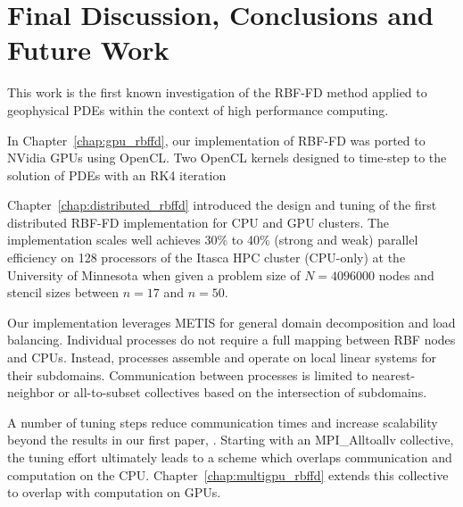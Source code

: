 \chapter{Final Discussion, Conclusions and Future Work}
\label{chap:conclusions}

This work is the first known investigation of the RBF-FD method applied to geophysical PDEs within the context of high performance computing. 

In Chapter~\ref{chap:gpu_rbffd}, our implementation of RBF-FD was ported to NVidia GPUs using OpenCL. Two OpenCL kernels designed to time-step to the solution of PDEs with an RK4 iteration 


Chapter~\ref{chap:distributed_rbffd} introduced the design and tuning of the first distributed RBF-FD implementation for CPU and GPU clusters. The implementation scales well achieves 30\% to 40\% (strong and weak) parallel efficiency on 128 processors of the Itasca HPC cluster (CPU-only) at the University of Minnesota when given a problem size of $N=4096000$ nodes and stencil sizes between $n=17$ and $n=50$. 

Our implementation leverages METIS for general domain decomposition and load balancing. Individual processes do not require a full mapping between RBF nodes and CPUs. Instead, processes assemble and operate on local linear systems for their subdomains. Communication between processes is limited to nearest-neighbor or all-to-subset collectives based on the intersection of subdomains. 

A number of tuning steps reduce communication times and increase scalability beyond the results in our first paper, \cite{BolligFlyerErlebacher2012}. Starting with an MPI\_Alltoallv collective, the tuning effort ultimately leads to a scheme which overlaps communication and computation on the CPU. Chapter~\ref{chap:multigpu_rbffd} extends this collective to overlap with computation on GPUs. 



